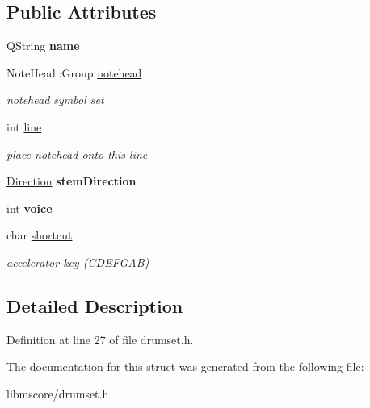 \subsection*{Public Attributes}
\begin{DoxyCompactItemize}
\item 
\mbox{\label{struct_ms_1_1_drum_instrument_aba80b530d24b1ba37041868000025ba2}} 
Q\+String {\bfseries name}
\item 
\mbox{\label{struct_ms_1_1_drum_instrument_a48f9bf0071d80ddabf25bd9070b371ae}} 
Note\+Head\+::\+Group \hyperlink{struct_ms_1_1_drum_instrument_a48f9bf0071d80ddabf25bd9070b371ae}{notehead}
\begin{DoxyCompactList}\small\item\em notehead symbol set \end{DoxyCompactList}\item 
\mbox{\label{struct_ms_1_1_drum_instrument_a07378d42e7c816acd78de096c992d390}} 
int \hyperlink{struct_ms_1_1_drum_instrument_a07378d42e7c816acd78de096c992d390}{line}
\begin{DoxyCompactList}\small\item\em place notehead onto this line \end{DoxyCompactList}\item 
\mbox{\label{struct_ms_1_1_drum_instrument_a269972bed18a838be4aa2c49e233db58}} 
\hyperlink{class_ms_1_1_direction}{Direction} {\bfseries stem\+Direction}
\item 
\mbox{\label{struct_ms_1_1_drum_instrument_a6b4afb779ca3a500079dee0dd9b4efac}} 
int {\bfseries voice}
\item 
\mbox{\label{struct_ms_1_1_drum_instrument_a46b98c59f6a990a79ca4535f98b21a11}} 
char \hyperlink{struct_ms_1_1_drum_instrument_a46b98c59f6a990a79ca4535f98b21a11}{shortcut}
\begin{DoxyCompactList}\small\item\em accelerator key (C\+D\+E\+F\+G\+AB) \end{DoxyCompactList}\end{DoxyCompactItemize}


\subsection{Detailed Description}


Definition at line 27 of file drumset.\+h.



The documentation for this struct was generated from the following file\+:\begin{DoxyCompactItemize}
\item 
libmscore/drumset.\+h\end{DoxyCompactItemize}

